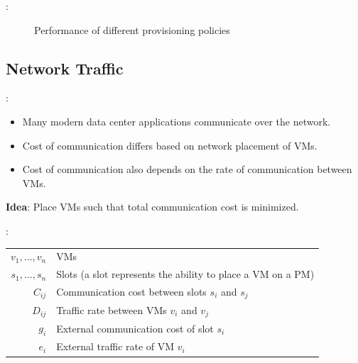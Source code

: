 \documentclass[aspectratio=169]{beamer}
\begin{document}
\begin{frame}{\insertsectionhead: \insertsubsectionhead}
    \centering
    \begin{figure}
        \resizebox{0.8\paperwidth}{!}{}
        \caption{Performance of different provisioning policies \cite{gmach_resource_2009}}
    \end{figure}
\end{frame}

\subsection{Network Traffic}

\begin{frame}{\insertsectionhead: \insertsubsectionhead}
    \begin{itemize}
        \item
            Many modern data center applications communicate over the network.

        \item
            Cost of communication differs based on network placement of VMs.

        \item
            Cost of communication also depends on the rate of communication between VMs.
    \end{itemize}

    \vfill
    \centering
    \textbf{Idea}: Place VMs such that total communication cost is minimized.
\end{frame}

\begin{frame}{\insertsectionhead: \insertsubsectionhead}
    \begin{tabular}{rl}
        \(v_1, \dots, v_n\) & VMs \\
        \(s_1, \dots, s_n\) & Slots (a slot represents the ability to place a VM on a PM) \\
        \(C_{ij}\) & Communication cost between slots \(s_i\) and \(s_j\) \\
        \(D_{ij}\) & Traffic rate between VMs \(v_i\) and \(v_j\) \\
        \(g_i\) & External communication cost of slot \(s_i\) \\
        \(e_i\) & External traffic rate of VM \(v_i\)
    \end{tabular}

\end{frame}
\end{document}
